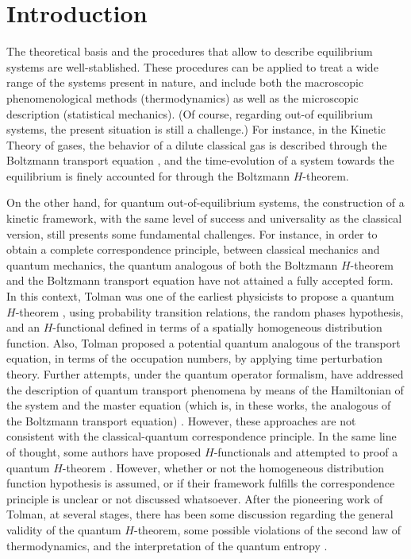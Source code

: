\section{Introduction}

The theoretical basis and the procedures that allow to describe equilibrium systems
are well-stablished. These procedures can be applied to treat a wide range of the systems
present in nature, and include both the macroscopic phenomenological methods (thermodynamics)
as well as the microscopic description (statistical mechanics).
(Of course, regarding out-of equilibrium systems, the present situation is still a challenge.)
For instance,
in the Kinetic Theory of gases, the behavior of a dilute classical gas
is described through the Boltzmann transport equation \cite{bib:huang},
and the time-evolution of a system towards the equilibrium is finely accounted for
through the Boltzmann $H$-theorem.

On the other hand, for quantum out-of-equilibrium systems, the construction of a
kinetic framework, with the same level of
success and universality as the classical version, still presents some fundamental challenges. For instance,
in order to obtain a complete correspondence principle, between classical mechanics
and quantum mechanics, the quantum analogous of both the Boltzmann $H$-theorem
and the Boltzmann transport equation have not attained a fully accepted form.
In this context, Tolman was one of the earliest physicists to propose a quantum
$H$-theorem \cite{bib:tolman}, using probability transition relations, the random
phases hypothesis, and an $H$-functional defined in terms of a spatially homogeneous distribution function.
Also, Tolman proposed a potential quantum analogous of the transport equation,
in terms of the occupation numbers,
by applying time perturbation theory. Further attempts, under the quantum operator
formalism, have addressed the description of quantum transport phenomena by means of the Hamiltonian
of the system and the master equation (which is, in these works, the analogous
of the Boltzmann transport equation)
\cite{bib:grabert1974,bib:wang2014,%
bib:angel2017,
bib:amato2020,bib:nicacio2015,bib:hussein2014}. However, these approaches 
are not consistent with the classical-quantum correspondence principle.
In the same line of thought, some authors have proposed $H$-functionals
and attempted to proof a
quantum $H$-theorem \cite{bib:gorban2014,bib:bennaim2017,bib:silva2010,%
bib:deroeck2006,bib:acharya2019,bib:kastner2017,bib:han2015,bib:das2018,bib:vonneumann2010}.
However, whether or not the homogeneous distribution function hypothesis is assumed, or
if their framework fulfills the correspondence principle is unclear or not discussed whatsoever.
After the pioneering work of Tolman, at several stages, there has been some discussion regarding
the general validity of the quantum $H$-theorem,
some possible violations of the second law of thermodynamics, and the
interpretation of the quantum entropy  %
\cite{bib:silva2010,bib:acharya2019,bib:kastner2017,bib:han2015,bib:brown2008,%
bib:dragoljub2009,bib:vonneumann2010,%
bib:syros1999,bib:lesovik2016,
bib:lesovik2019}.

